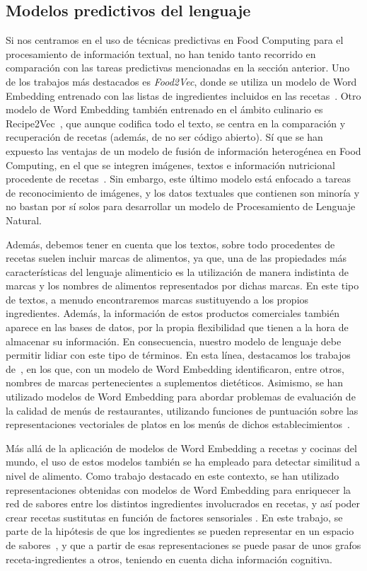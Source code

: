 \subsection{Modelos predictivos del lenguaje}

Si nos centramos en el uso de técnicas predictivas en Food Computing para el procesamiento de información textual, no han tenido tanto recorrido en comparación con las tareas predictivas mencionadas en la sección anterior. Uno de los trabajos más destacados es \textit{Food2Vec}, donde se utiliza un modelo de Word Embedding entrenado con las listas de ingredientes incluidos en las recetas~\cite{food2vec}. Otro modelo de Word Embedding también entrenado en el ámbito culinario es Recipe2Vec~\cite{recipe2vec}, que aunque codifica todo el texto, se centra en la comparación y recuperación de recetas (además, de no ser código abierto). Sí que se han expuesto las ventajas de un modelo de fusión de información heterogénea en Food Computing, en el que se integren imágenes, textos e información nutricional procedente de recetas~\cite{8099810}. Sin embargo, este último modelo está enfocado a tareas de reconocimiento de imágenes, y los datos textuales que contienen son minoría y no bastan por sí solos para desarrollar un modelo de Procesamiento de Lenguaje Natural.

Además, debemos tener en cuenta que los textos, sobre todo procedentes de recetas suelen incluir marcas de alimentos, ya que, una de las propiedades más características del lenguaje alimenticio es la utilización de manera indistinta de marcas y los nombres de alimentos representados por dichas marcas. En este tipo de textos, a menudo encontraremos marcas sustituyendo a los propios ingredientes. Además, la información de estos productos comerciales también aparece en las bases de datos, por la propia flexibilidad que tienen a la hora de almacenar su información. En consecuencia, nuestro modelo de lenguaje debe permitir lidiar con este tipo de términos. En esta línea, destacamos los trabajos de~\cite{10.1093/jamiaopen/ooz007}, en los que, con un modelo de Word Embedding identificaron, entre otros, nombres de marcas pertenecientes a suplementos dietéticos. Asimismo, se han utilizado modelos de Word Embedding para abordar problemas de evaluación de la calidad de menús de restaurantes, utilizando funciones de puntuación sobre las representaciones vectoriales de platos en los menús de dichos establecimientos~\cite{chao2016dish}.

Más allá de la aplicación de modelos de Word Embedding a recetas y cocinas del mundo, el uso de estos modelos también se ha empleado para detectar similitud a nivel de alimento. Como trabajo destacado en este contexto, se han utilizado representaciones obtenidas con modelos de Word Embedding para enriquecer la red de sabores entre los distintos ingredientes involucrados en recetas, y así poder crear recetas sustitutas en función de factores sensoriales \cite{Sauer2017CookingUF}. En este trabajo, se parte de la hipótesis de que los ingredientes se pueden representar en un espacio de sabores~\cite{ahn2011flavor}, y que a partir de esas representaciones se puede pasar de unos grafos receta-ingredientes a otros, teniendo en cuenta dicha información cognitiva.

